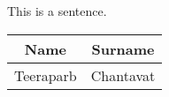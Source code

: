 \documentclass[12pt, a4paper]{article}
\begin{document}
This is a sentence.
\begin{tabular}{|c|c|}
	\hline
	Name & Surname \\
	\hline
	Teeraparb & Chantavat \\
	\hline
\end{tabular}
\end{document}
